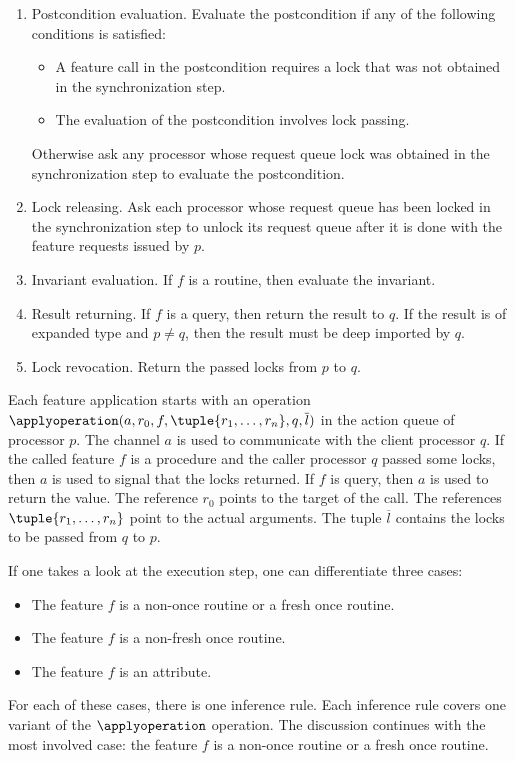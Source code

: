\begin{enumerate}
\begin{itemize}
		\end{itemize}
	\item Postcondition evaluation. Evaluate the postcondition if any of the following conditions is satisfied:
		\begin{itemize}
			\item A feature call in the postcondition requires a lock that was not obtained in the synchronization step.
			\item The evaluation of the postcondition involves lock passing.
		\end{itemize}
		Otherwise ask any processor whose request queue lock was obtained in the synchronization step to evaluate the postcondition.
	\item Lock releasing. Ask each processor whose request queue has been locked in the synchronization step to unlock its request queue after it is done with the feature requests issued by $p$.
	\item Invariant evaluation. If $f$ is a routine, then evaluate the invariant.
	\item Result returning. If $f$ is a query, then return the result to $q$. If the result is of expanded type and $p \neq q$, then the result must be deep imported by $q$.
	\item Lock revocation. Return the passed locks from $p$ to $q$.
\end{enumerate}
Each feature application starts with an operation $\applyoperation(a, r_{0}, f, \tuple{r_{1}, \ldots, r_{n}}, q, \overline{l})$ in the action queue of processor $p$. The channel $a$ is used to communicate with the client processor $q$. If the called feature $f$ is a procedure and the caller processor $q$ passed some locks, then $a$ is used to signal that the locks returned. If $f$ is query, then $a$ is used to return the value. The reference $r_{0}$ points to the target of the call. The references $\tuple{r_{1}, \ldots, r_{n}}$ point to the actual arguments. The tuple $\overline{l}$ contains the locks to be passed from $q$ to $p$.

If one takes a look at the execution step, one can differentiate three cases:
\begin{itemize}
	\item The feature $f$ is a non-once routine or a fresh once routine.
	\item The feature $f$ is a non-fresh once routine.
	\item The feature $f$ is an attribute.
\end{itemize}
For each of these cases, there is one inference rule. Each inference rule covers one variant of the $\applyoperation$ operation. The discussion continues with the most involved case: the feature $f$ is a non-once routine or a fresh once routine.


